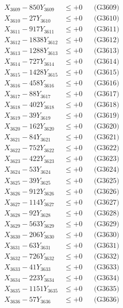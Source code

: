 \documentclass[a4paper,10pt]{article}
\begin{document}
{\begin{align}
X_{3609} - 850Y_{3609} &\leq +0 && \text{(G3609)} \\
X_{3610} - 27Y_{3610} &\leq +0 && \text{(G3610)} \\
\allowbreak
X_{3611} - 917Y_{3611} &\leq +0 && \text{(G3611)} \\
X_{3612} - 1838Y_{3612} &\leq +0 && \text{(G3612)} \\
X_{3613} - 1288Y_{3613} &\leq +0 && \text{(G3613)} \\
X_{3614} - 727Y_{3614} &\leq +0 && \text{(G3614)} \\
X_{3615} - 1428Y_{3615} &\leq +0 && \text{(G3615)} \\
X_{3616} - 458Y_{3616} &\leq +0 && \text{(G3616)} \\
X_{3617} - 88Y_{3617} &\leq +0 && \text{(G3617)} \\
X_{3618} - 402Y_{3618} &\leq +0 && \text{(G3618)} \\
X_{3619} - 39Y_{3619} &\leq +0 && \text{(G3619)} \\
X_{3620} - 162Y_{3620} &\leq +0 && \text{(G3620)} \\
\allowbreak
X_{3621} - 84Y_{3621} &\leq +0 && \text{(G3621)} \\
X_{3622} - 752Y_{3622} &\leq +0 && \text{(G3622)} \\
X_{3623} - 422Y_{3623} &\leq +0 && \text{(G3623)} \\
X_{3624} - 53Y_{3624} &\leq +0 && \text{(G3624)} \\
X_{3625} - 39Y_{3625} &\leq +0 && \text{(G3625)} \\
X_{3626} - 912Y_{3626} &\leq +0 && \text{(G3626)} \\
X_{3627} - 114Y_{3627} &\leq +0 && \text{(G3627)} \\
X_{3628} - 92Y_{3628} &\leq +0 && \text{(G3628)} \\
X_{3629} - 563Y_{3629} &\leq +0 && \text{(G3629)} \\
X_{3630} - 206Y_{3630} &\leq +0 && \text{(G3630)} \\
\allowbreak
X_{3631} - 63Y_{3631} &\leq +0 && \text{(G3631)} \\
X_{3632} - 726Y_{3632} &\leq +0 && \text{(G3632)} \\
X_{3633} - 41Y_{3633} &\leq +0 && \text{(G3633)} \\
X_{3634} - 223Y_{3634} &\leq +0 && \text{(G3634)} \\
X_{3635} - 1151Y_{3635} &\leq +0 && \text{(G3635)} \\
X_{3636} - 57Y_{3636} &\leq +0 && \text{(G3636)} \\

\end{align}}
\end{document}
